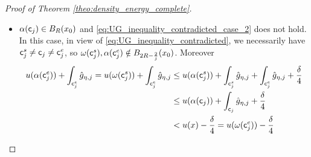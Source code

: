 \documentclass[12pt]{amsart}
\theoremstyle{definition}
\newcommand{\sfc}{{\sf c}}
\begin{document}
\begin{proof}[Proof of Theorem \ref{theo:density_energy_complete}]
\begin{itemize}
\begin{equation}
            \label{eq:UG_inequality_contradicted_case_2}
            u(\alpha(\sfc_j^s)) + \int_{\sfc_j^s} \hat{g}_{\eta,j} < u(\omega(\sfc_j^s)) - \frac{\delta}{4}.
        \end{equation}
        \item[(3)] $\alpha(\sfc_j) \in B_{R}(x_0)$ and \eqref{eq:UG_inequality_contradicted_case_2} does not hold. In this case, in view of \eqref{eq:UG_inequality_contradicted}, we necessarily have $\sfc_j^s \neq \sfc_j \neq \sfc_j^e$, so $\omega(\sfc_j^s), \alpha(\sfc_j^e) \notin B_{2R - \frac{2}{j}}(x_0)$. Moreover
        \begin{equation}
            \label{eq:UG_inequality_contradicted_case_3}
            \begin{aligned}
                u(\alpha(\sfc_j^e)) + \int_{\sfc_j^e} \hat{g}_{\eta,j} = u(\omega(\sfc_j^s)) + \int_{\sfc_j^e} \hat{g}_{\eta,j} &\le u(\alpha(\sfc_j^s)) + \int_{\sfc_j^s} \hat{g}_{\eta,j} + \int_{\sfc_j^e} \hat{g}_{\eta,j} + \frac{\delta}{4}\\
                &\le u(\alpha(\sfc_j)) + \int_{\sfc_j} \hat{g}_{\eta,j} + \frac{\delta}{4} \\
                &< u(x) - \frac{\delta}{4} = u(\omega(\sfc_j^e)) - \frac{\delta}{4}
            \end{aligned}
        \end{equation}
    \end{itemize}


\end{proof}
\end{document}
